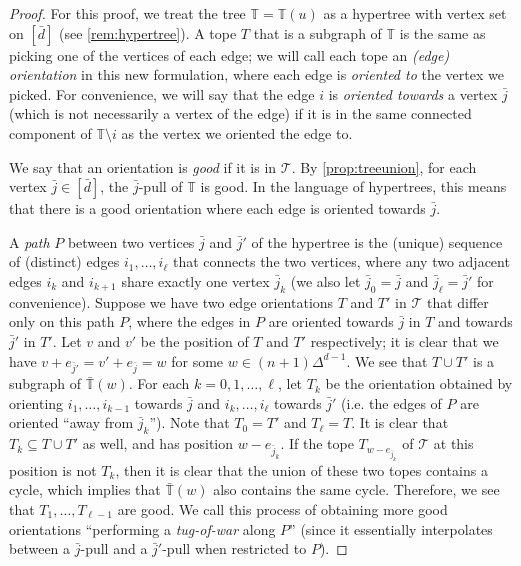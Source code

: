 \documentclass[letterpaper,reqno,11pt]{amsart}
\begin{document}
\begin{proof}
    For this proof, we treat the tree $\mathbb{T} = \mathbb{T}(u)$ as a hypertree with vertex set on $[\bar{d}]$ (see \cref{rem:hypertree}). A tope $T$ that is a subgraph of $\mathbb{T}$ is the same as picking one of the vertices of each edge; we will call each tope an \emph{(edge) orientation} in this new formulation, where each edge is \emph{oriented to} the vertex we picked. For convenience, we will say that the edge $i$ is \emph{oriented towards} a vertex $\bar{j}$ (which is not necessarily a vertex of the edge) if it is in the same connected component of $\mathbb{T}\setminus i$ as the vertex we oriented the edge to. %
    
    We say that an orientation is \emph{good} if it is in $\mathcal{T}$. By \cref{prop:treeunion}, for each vertex $\bar{j}\in [\bar{d}]$, the $\bar{j}$-pull of $\mathbb{T}$ is good. In the language of hypertrees, this means that there is a good orientation where each edge is oriented towards $\bar{j}$.
    
    A \emph{path} $P$ between two vertices $\bar{j}$ and $\bar{j}'$ of the hypertree is the (unique) sequence of (distinct) edges $i_1, \dots, i_{\ell}$ that connects the two vertices, where any two adjacent edges $i_k$ and $i_{k+1}$ share exactly one vertex $\bar{j}_k$ (we also let $\bar{j}_0 = \bar{j}$ and $\bar{j}_{\ell} = \bar{j}'$ for convenience). Suppose we have two edge orientations $T$ and $T'$ in $\mathcal{T}$ that differ only on this path $P$, where the edges in $P$ are oriented towards $\bar{j}$ in $T$ and towards $\bar{j}'$ in $T'$. Let $v$ and $v'$ be the position of $T$ and $T'$ respectively; it is clear that we have $v + e_{\bar{j}'} = v' + e_{\bar{j}} = w$ for some $w\in (n+1)\Delta^{d-1}$. We see that $T\cup T'$ is a subgraph of $\bar{\mathbb{T}}(w)$. For each $k =0, 1, \dots, \ell $, let $T_k$ be the orientation obtained by orienting $i_1, \dots, i_{k-1}$ towards $\bar{j}$ and $i_{k}, \dots, i_{\ell}$ towards $\bar{j}'$ (i.e. the edges of $P$ are oriented ``away from $\bar{j}_k$''). Note that $T_0 = T'$ and $T_{\ell} = T$. It is clear that $T_k \subseteq T\cup T'$ as well, and has position $w - e_{\bar{j}_k}$. If the tope $T_{w - e_{\bar{j}_k}}$ of $\mathcal{T}$ at this position is not $T_k$, then it is clear that the union of these two topes contains a cycle, which implies that $\bar{\mathbb{T}}(w)$ also contains the same cycle. Therefore, we see that $T_1, \dots, T_{\ell - 1}$ are good. We call this process of obtaining more good orientations ``performing a \emph{tug-of-war} along $P$'' (since it essentially interpolates between a $\bar{j}$-pull and a $\bar{j}'$-pull when restricted to $P$).


\end{proof}
\end{document}
